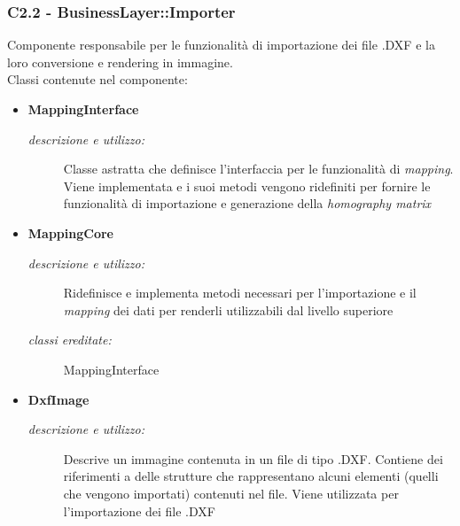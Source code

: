 \subsubsection{C2.2 - BusinessLayer::Importer} \label{sec:c2.2}
Componente responsabile per le funzionalità di importazione dei file .DXF e la loro conversione e rendering in immagine. \\
Classi contenute nel componente: 
\begin{itemize} 
\item \textbf{MappingInterface}
\begin{description}
\item [\textit{descrizione e utilizzo:}] Classe astratta che definisce l'interfaccia per le funzionalità di \textit{mapping}. Viene implementata e i suoi metodi vengono ridefiniti per fornire le funzionalità di importazione e generazione della \textit{homography matrix}
\end{description}
\item \textbf{MappingCore}
\begin{description}
\item [\textit{descrizione e utilizzo:}] Ridefinisce e implementa metodi necessari per l'importazione e il \textit{mapping} dei dati per renderli utilizzabili dal livello superiore
\item [\textit{classi ereditate:}] MappingInterface
\end{description}
\item \textbf{DxfImage}
\begin{description}
\item [\textit{descrizione e utilizzo:}] Descrive un immagine contenuta in un file di tipo .DXF. Contiene dei riferimenti a delle strutture che rappresentano alcuni elementi (quelli che vengono importati) contenuti nel file. Viene utilizzata per l'importazione dei file .DXF


\end{description}
\end{itemize}
